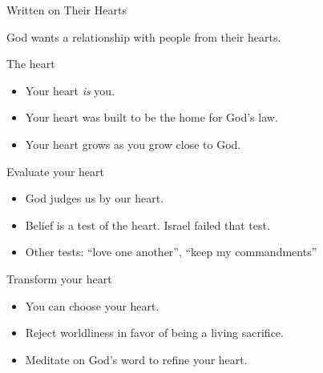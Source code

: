 \begin{frame}{Written on Their Hearts}
	\begin{center}
		God wants a relationship with people from their hearts.
	\end{center}
	The heart
	\begin{itemize}
		\item Your heart \emph{is} you.
		\item Your heart was built to be the home for God's law.
		\item Your heart grows as you grow close to God.
	\end{itemize}
	Evaluate your heart
	\begin{itemize}
	\item God judges us by our heart.
	\item Belief is a test of the heart.  Israel failed that test.
	\item Other tests: ``love one another'', ``keep my commandments''
	\end{itemize}
	Transform your heart
	\begin{itemize}
	\item You can choose your heart.
	\item Reject worldliness in favor of being a living sacrifice.
	\item Meditate on God's word to refine your heart.
	\end{itemize}
	
\end{frame}

%
%
%
